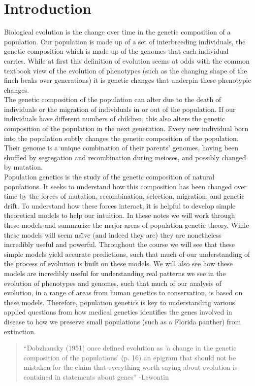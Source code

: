 \chapter{Introduction}
 Biological evolution is the change over time in the genetic composition of a population.\cite{DobzhanskyBook} Our population is made up of a set of interbreeding individuals, the genetic composition which is made up of the  genomes that each individual carries.  While at first this definition of evolution seems at odds with the
common textbook view of the evolution of phenotypes (such as the changing shape
of the finch beaks over generations) it is genetic changes that underpin these
phenotypic changes.  \\

The genetic composition of the population can alter due to the death of individuals or the migration of individuals in or out
of the population. If our individuals have different numbers of children, this
also alters the genetic composition of the population in the next generation.
Every new individual born into the population subtly changes the genetic
composition of the population. Their genome is a unique combination of their
parents' genomes, having been shuffled by segregation and recombination during
meioses, and possibly changed by mutation. \\

Population genetics is the study of the genetic composition of natural
populations. It seeks to understand how this composition has been changed over
time by the forces of mutation, recombination, selection, migration, and
genetic drift.  To understand how these forces interact, it is helpful to
develop simple theoretical models to help our intuition. In these notes we will
work through these models and summarize the major areas of population genetic
theory. While these models will seem na\"{\i}ve (and indeed they are) they are
nonetheless incredibly useful and powerful. Throughout the course we will see
that these simple models yield accurate predictions, such that much of our
understanding of the process of evolution is built on these models. We will
also see how these models are incredibly useful for understanding real patterns
we see in the evolution of phenotypes and genomes, such that much of our
analysis of evolution, in a range of areas from human genetics to conservation,
is based on these models. Therefore, population genetics is key to
understanding various applied questions from how medical genetics identifies
the genes involved in disease to how we preserve small populations (such as a
Florida panther) from extinction. 


\begin{quotation}
``Dobzhansky (1951) once defined evolution as 'a change in the genetic
composition of the populations' (p. 16) an epigram that should not be
mistaken for the claim that everything worth saying about evolution is
contained in statements about genes'' -Lewontin \cite{lewontin01} 
\end{quotation}

\newpage